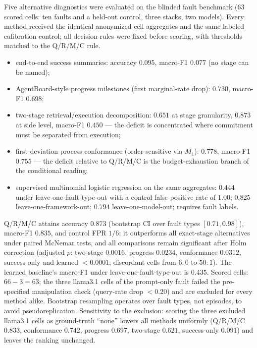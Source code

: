 \documentclass[letterpaper]{article}
\begin{document}
Five alternative diagnostics were evaluated on the blinded fault
benchmark (63 scored cells: ten faults and a held-out control, three
stacks, two models). Every method received the identical anonymized
cell aggregates and the same labeled calibration control; all
decision rules were fixed before scoring, with thresholds matched to
the Q/R/M/C rule.

\begin{itemize}
    \item end-to-end success summaries: accuracy $0.095$, macro-F1
      $0.077$ (no stage can be named);
    \item AgentBoard-style progress milestones (first marginal-rate
      drop): $0.730$, macro-F1 $0.698$;
    \item two-stage retrieval/execution decomposition: $0.651$ at
      stage granularity, $0.873$ at side level, macro-F1 $0.450$ ---
      the deficit is concentrated where commitment must be separated
      from execution;
    \item first-deviation process conformance (order-sensitive via
      $M_1$): $0.778$, macro-F1 $0.755$ --- the deficit relative to
      Q/R/M/C is the budget-exhaustion branch of the conditional
      reading;
    \item supervised multinomial logistic regression on the same
      aggregates: $0.444$ under leave-one-fault-type-out with a
      control false-positive rate of $1.00$; $0.825$
      leave-one-framework-out; $0.794$ leave-one-model-out; requires
      fault labels.
\end{itemize}

Q/R/M/C attains accuracy $0.873$ (bootstrap CI over fault types
$[0.71, 0.98]$), macro-F1 $0.835$, and control FPR $1/6$; it
outperforms all exact-stage alternatives under paired McNemar tests,
and all comparisons remain significant after Holm correction
(adjusted $p$: two-stage $0.0016$, progress $0.0234$, conformance
$0.0312$, success-only and learned $<0.0001$; discordant cells from
$6{:}0$ to $50{:}1$). The learned baseline's macro-F1 under
leave-one-fault-type-out is $0.435$. Scored cells: $66-3=63$; the
three llama3.1 cells of the prompt-only fault failed the
pre-specified manipulation check (query-rate drop $<0.20$) and are
excluded for every method alike. Bootstrap resampling operates over
fault types, not episodes, to avoid pseudoreplication. Sensitivity to
the exclusion: scoring the three excluded llama3.1 cells as
ground-truth ``none'' lowers all methods uniformly (Q/R/M/C $0.833$,
conformance $0.742$, progress $0.697$, two-stage $0.621$,
success-only $0.091$) and leaves the ranking unchanged.
\end{document}
